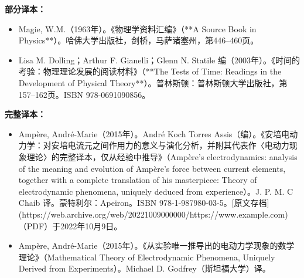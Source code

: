 \textbf{部分译本：}
\begin{itemize}
\item Magie, W.M.（1963年）。《物理学资料汇编》（**A Source Book in Physics**）。哈佛大学出版社，剑桥，马萨诸塞州，第446–460页。
\item Lisa M. Dolling；Arthur F. Gianelli；Glenn N. Statile 编（2003年）。《时间的考验：物理理论发展的阅读材料》（**The Tests of Time: Readings in the Development of Physical Theory**）。普林斯顿：普林斯顿大学出版社，第157–162页。ISBN 978-0691090856。
\end{itemize}
\textbf{完整译本：}
\begin{itemize}
\item Ampère, André-Marie（2015年）。André Koch Torres Assis（编）。《安培电动力学：对安培电流元之间作用力的意义与演化分析，并附其代表作〈电动力现象理论〉的完整译本，仅从经验中推导》（Ampère's electrodynamics: analysis of the meaning and evolution of Ampère's force between current elements, together with a complete translation of his masterpiece: Theory of electrodynamic phenomena, uniquely deduced from experience）。J. P. M. C Chaib 译。蒙特利尔：Apeiron。ISBN 978-1-987980-03-5。[原文存档](https://web.archive.org/web/20221009000000/https://www.example.com)（PDF）于2022年10月9日。
\item Ampère, André-Marie（2015年）。《从实验唯一推导出的电动力学现象的数学理论》（Mathematical Theory of Electrodynamic Phenomena, Uniquely Derived from Experiments）。Michael D. Godfrey（斯坦福大学）译。
\end{itemize}
